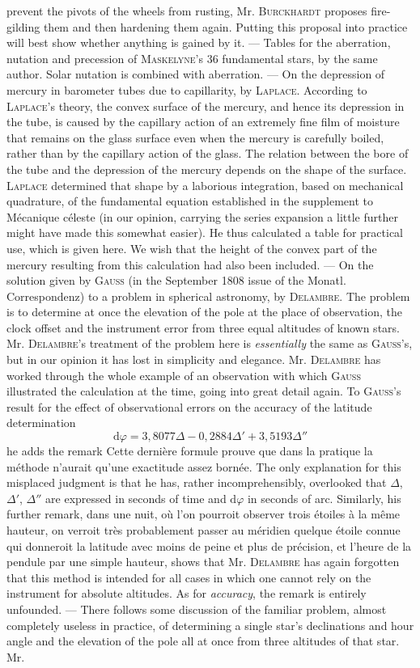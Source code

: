 prevent the pivots of the wheels from rusting, Mr. \textsc{Burckhardt} proposes fire-gilding them and then hardening them again. Putting this proposal into practice will best show whether anything is gained by it. --- Tables for the aberration, nutation and precession of \textsc{Maskelyne}'s 36 fundamental stars, by the same author. Solar nutation is combined with aberration. --- On the depression of mercury in barometer tubes due to capillarity, by \textsc{Laplace}. According to \textsc{Laplace}'s theory, the convex surface of the mercury, and hence its depression in the tube, is caused by the capillary action of an extremely fine film of moisture that remains on the glass surface even when the mercury is carefully boiled, rather than by the capillary action of the glass. The relation between the bore of the tube and the depression of the mercury depends on the shape of the surface. \textsc{Laplace} determined that shape by a laborious integration, based on mechanical quadrature, of the fundamental equation established in the supplement to Mécanique céleste (in our opinion, carrying the series expansion a little further might have made this somewhat easier). He thus calculated a table for practical use, which is given here. We wish that the height of the convex part of the mercury resulting from this calculation had also been included. --- On the solution given by \textsc{Gauss} (in the September 1808 issue of the Monatl. Correspondenz) to a problem in spherical astronomy, by \textsc{Delambre}. The problem is to determine at once the elevation of the pole at the place of observation, the clock offset and the instrument error from three equal altitudes of known stars. Mr. \textsc{Delambre}'s treatment of the problem here is \emph{essentially} the same as \textsc{Gauss}'s, but in our opinion it has lost in simplicity and elegance. Mr. \textsc{Delambre} has worked through the whole example of an observation with which \textsc{Gauss} illustrated the calculation at the time, going into great detail again. To \textsc{Gauss}'s result for the effect of observational errors on the accuracy of the latitude determination  \[ \mathrm{d}\varphi = 3{,}8077\Delta - 0{,}2884\Delta' + 3{,}5193\Delta'' \] he adds the remark Cette dernière formule prouve que dans la pratique la méthode n'aurait qu'une exactitude assez bornée. The only explanation for this misplaced judgment is that he has, rather incomprehensibly, overlooked that $\Delta$, $\Delta'$, $\Delta''$ are expressed in seconds of time and $\mathrm{d}\varphi$ in seconds of arc. Similarly, his further remark, dans une nuit, où l'on pourroit observer trois étoiles à la même hauteur, on verroit très probablement passer au méridien quelque étoile connue qui donneroit la latitude avec moins de peine et plus de précision, et l'heure de la pendule par une simple hauteur, shows that Mr. \textsc{Delambre} has again forgotten that this method is intended for all cases in which one cannot rely on the instrument for absolute altitudes. As for \emph{accuracy}, the remark is entirely unfounded. --- There follows some discussion of the familiar problem, almost completely useless in practice, of determining a single star's declinations and hour angle and the elevation of the pole all at once from three altitudes of that star. Mr. 